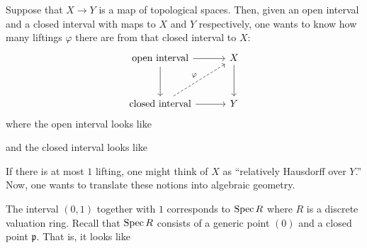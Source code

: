 \documentclass [11 pt, oneside] {article}
\begin{document}
Suppose that $X\longrightarrow Y$ is a map of topological spaces. Then, given an open interval and a closed interval with maps to $X$ and $Y$ respectively, one wants to know how many liftings $\varphi$ there are from that closed interval to $X$:
\[
\begin{tikzcd}[column sep = 3 em, row sep = 3 em]
	\textrm{open interval} \ar[r]\ar[d] &X \ar[d]\\ \textrm{closed interval} \ar[r]\ar[ur,dashed,"\varphi"] &Y
\end{tikzcd}
\]
where the open interval looks like
\begin{center}
\end{center}
and the closed interval looks like
\begin{center}
\end{center}
If there is at most $1$ lifting, one might think of $X$ as ``relatively Hausdorff over $Y$.'' Now, one wants to translate these notions into algebraic geometry.

The interval $(0,1)$ together with $1$ corresponds to $\operatorname{Spec} R$ where $R$ is a discrete valuation ring. Recall that $\operatorname{Spec} R$ consists of a generic point $(0)$ and a closed point $\mathfrak{p}$. That is, it looks like
\begin{center}
\end{center}
\end{document}
